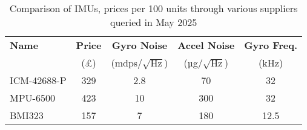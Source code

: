 \begin{table}[h]
  \centering
  \begin{tabular}{lcccc}
    \toprule
    \textbf{Name} & \textbf{Price} & \textbf{Gyro Noise} & \textbf{Accel Noise} & \textbf{Gyro Freq.} \\
    & (£) & (mdps/$\sqrt{\text{Hz}}$) & (µg/$\sqrt{\text{Hz}}$) & (kHz) \\
    \midrule
    ICM-42688-P\cite{tdk_icm42688p} & 329 & 2.8 & 70 & 32 \\
    MPU-6500\cite{tdk_mpu6500}& 423 & 10  & 300 & 32 \\
    BMI323\cite{bosch_bmi323} & 157 & 7   & 180 & 12.5 \\
    \bottomrule
  \end{tabular}
  \caption[Comparison of IMUs]{Comparison of IMUs, prices per 100 units through various suppliers queried in May 2025}
  \label{tab:imu-comparison}
\end{table}

